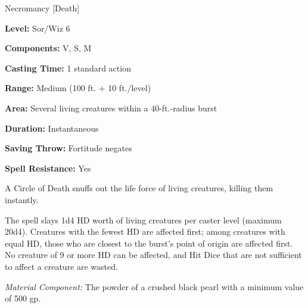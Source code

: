 
Necromancy [Death]

\textbf{Level:} Sor/Wiz 6

\textbf{Components:} V, S, M

\textbf{Casting Time:} 1 standard action

\textbf{Range:} Medium (100 ft. + 10 ft./level)

\textbf{Area:} Several living creatures within a 40-ft.-radius burst

\textbf{Duration:} Instantaneous

\textbf{Saving Throw:} Fortitude negates

\textbf{Spell Resistance:} Yes

A Circle of Death snuffs out the life force of living creatures, killing 
them instantly.

The spell slays 1d4 HD worth of living creatures per caster level (maximum 20d4). 
Creatures with the fewest HD are affected first; among creatures with equal HD, 
those who are closest to the burst's point of origin are affected first. No creature 
of 9 or more HD can be affected, and Hit Dice that are not sufficient to affect 
a creature are wasted.

\textit{Material Component:} The powder of a crushed black pearl with a minimum 
value of 500 gp.

